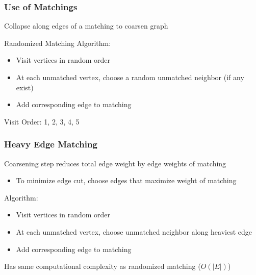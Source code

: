 \documentclass{beamer}
\begin{document}
\begin{frame}[noframenumbering]
  \frametitle{Use of Matchings}

  Collapse along edges of a matching to coarsen graph

  Randomized Matching Algorithm:
  \begin{itemize}
    \item Visit vertices in random order
    \item At each unmatched vertex, choose a random unmatched neighbor (if any exist)
    \item Add corresponding edge to matching
  \end{itemize}

  \begin{center}
  \end{center}

  Visit Order: 1, 2, 3, 4, 5

\end{frame}

\begin{frame}
  \frametitle{Heavy Edge Matching}

  Coarsening step reduces total edge weight by edge weights of matching
  \begin{itemize}
    \item To minimize edge cut, choose edges that maximize weight of matching
  \end{itemize}

  Algorithm:
  \begin{itemize}
    \item Visit vertices in random order
    \item At each unmatched vertex, choose unmatched neighbor along heaviest edge
    \item Add corresponding edge to matching
  \end{itemize}

  Has same computational complexity as randomized matching ($O(|E|)$)
\end{frame}
\end{document}
